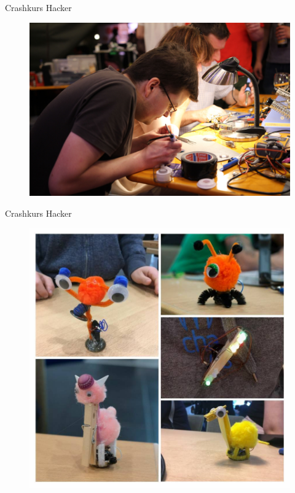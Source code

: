 \documentclass[10pt]{beamer}
\begin{document}
\begin{frame}[fragile]{Crashkurs Hacker}
	\begin{figure}
		\includegraphics[width=1\textwidth]{images/IMG_6130}
	\end{figure}
\end{frame}

\begin{frame}[fragile]{Crashkurs Hacker}
	\begin{figure}
		\includegraphics[width=.7\textwidth]{images/robots}
	\end{figure}
\end{frame}
\end{document}
